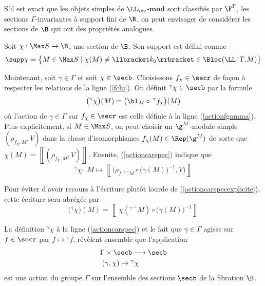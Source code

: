 S'il est exact que les objets simples de $\LL_{\ev}$-$\mathbf{mod}$ sont classifiés par $\F^\Gamma$, les sections $\Gamma$-invariantes à support fini de $\R$, on peut envisager de considérer les sections de $\B$ qui ont des propriétés analogues. 

Soit $\chi : \Max S \rightarrow \B$, une section de $\B$. Son support est défini comme
$$ \supp \chi = \big\{M \in \Max S \; | \; \chi(M) \neq \llbracket k_0 \rrbracket \in \Bloc(\LL \, | \, \Gamma.M)\big\}$$

Maintenant, soit $\gamma \in \Gamma$ et soit $\chi \in \secb$. Choisissons $f_\chi \in \secr$ de façon à respecter les relations de la ligne (\ref{fchi}). On définit ${}^\gamma \chi \in \secb$ par la formule
\begin{equation} \label{actioncarspec}
\big({}^\gamma \chi\big)(M) = \big(\bl_M \circ \, {}^\gamma f_\chi\big)(M)
\end{equation}
où l'action de $\gamma \in \Gamma$ sur $f_\chi \in \secr$ est celle définie à la ligne (\ref{actionfgamma}). Plus explicitement, si $M \in \Max S$, on peut choisir un $\g^M$-module simple $(\rho_{f_\chi,M},V)$ dans la classe d'isomorphismes $f_\chi(M) \in \Rep(\g^M)$ de sorte que $\chi(M) = \left\llbracket(\rho_{f_\chi,M},V)\right\rrbracket$. Ensuite, (\ref{actioncarspec}) indique que
\begin{equation} \label{actioncarspecexplicite}
{}^\gamma \chi : \; M \longmapsto \left\llbracket\Big(\rho_{f,{}^{\gamma^{-1}}M} \circ \big(\gamma(M)\big)^{-1},V\Big)\right\rrbracket
\end{equation}

\begin{Rem} Pour éviter d'avoir recours à l'écriture plutôt lourde de (\ref{actioncarspecexplicite}), cette écriture sera abrégée par
$$ \big({}^\gamma \chi\big)(M) = \left\llbracket \,\chi({}^{\gamma^{-1}}M) \circ \big(\gamma(M)\big)^{-1}\right\rrbracket $$ 
\end{Rem}

\begin{Rem} La définition ${}^\gamma \chi$ à la ligne (\ref{actioncarspec}) et le fait que $\gamma \in \Gamma$ agisse sur $f \in \secr$ par $f \mapsto {}^\gamma f$, révèlent ensemble que l'application
\begin{align*}
&\Gamma \times \secb \longrightarrow \secb\\
&\;(\gamma,\chi) \mapsto {}^\gamma \chi
\end{align*}
est une action du groupe $\Gamma$ sur l'ensemble des sections $\secb$ de la fibration $\B$.
\end{Rem}

